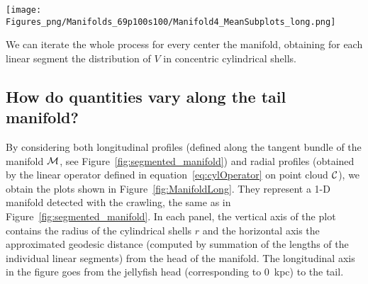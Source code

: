 \begin{sidewaysfigure}
  \centering
  \texttt{[image: Figures\_png/Manifolds\_69p100s100/Manifold4\_MeanSubplots\_long.png]}
  \caption{Longitudinal and radial profiles of different quantities for a long manifold constituting a tentacle of the tail of the jellyfish.
  In the top left corner, the position of the manifold in the diffused dataset is shown in red.
  In the top right corner a detailed view of the non diffused gaseous particle belonging to the manifold.}
  \label{fig:ManifoldLong}
\end{sidewaysfigure}


%

We can iterate the whole process for every center the manifold, obtaining for each linear segment the distribution of $V$ in concentric cylindrical shells.

\subsection{How do quantities vary along the tail manifold?}
By considering both longitudinal profiles (defined along the tangent bundle of the manifold $\mathcal{M}$, see Figure~\ref{fig:segmented_manifold})
and radial profiles (obtained by the linear operator defined in equation~\eqref{eq:cylOperator} on point cloud $\mathcal{C}$), we obtain the plots shown in Figure~\ref{fig:ManifoldLong}. %
They represent a 1-D manifold detected with the crawling, the same as in Figure~\ref{fig:segmented_manifold}.
In each panel, the vertical axis of the plot contains the radius of the cylindrical shells $r$
and the horizontal axis the approximated geodesic distance (computed by summation of the lengths of the individual linear segments) from the head of the manifold.
The longitudinal axis in the figure goes from the jellyfish head (corresponding to $0$~kpc) to the tail.

